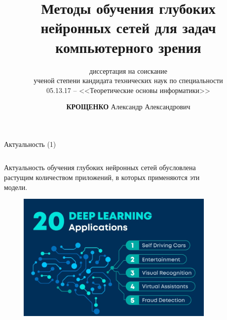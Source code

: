 \documentclass[10pt]{beamer}
\institute[]{Брестский государственный технический университет}
\title[]{\textbf{Методы обучения глубоких нейронных сетей для задач компьютерного зрения}}
\subtitle{диссертация на соискание\\ ученой степени кандидата технических наук по специальности\\ 05.13.17 -- <<Теоретические основы информатики>>}
\author[]{\textbf{КРОЩЕНКО} Александр Александрович}
\date{}
\begin{document}
	\begin{frame}
		\titlepage
	\end{frame}

        \begin{frame}{Актуальность (1)}
            \begin{columns}
                \begin{column}{0.5\textwidth}
                    Актуальность обучения глубоких нейронных сетей обусловлена растущим количеством приложений, в которых применяются эти модели.
                    \begin{figure}[H]
                          \centering
                          \includegraphics[width=\textwidth]{application_1.jpg}
                    \end{figure}
                \end{column}
                \begin{column}{0.5\textwidth}
                    \begin{figure}[H]
                          \centering

\end{figure}
\end{column}
\end{columns}
\end{frame}
\end{document}
